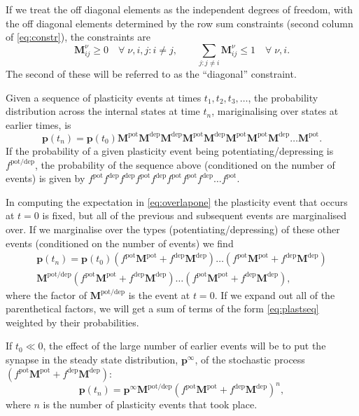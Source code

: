 \documentclass[12pt]{article}
\newcommand{\pr}{\mathbf{p}}
\newcommand{\eq}{\pr^\infty}
\newcommand{\M}{\mathbf{M}}
\newcommand{\pot}{^{\text{pot}}}
\newcommand{\dep}{^{\text{dep}}}
\newcommand{\potdep}{^{\text{pot/dep}}}
\begin{document}
If we treat the off diagonal elements as the independent degrees of freedom, with the off diagonal elements determined by the row sum constraints (second column of \eqref{eq:constr}), the constraints are
%
\begin{equation}\label{eq:constri}
  \M^\nu_{i j} \geq 0
    \quad \forall \; \nu, i, j : i \neq j, \qquad
  \sum_{j : j\neq i} \M^\nu_{ij} \leq 1
    \quad \forall \; \nu, i.
\end{equation}
%
The second of these will be referred to as the ``diagonal'' constraint.

Given a sequence of plasticity events at times $t_1,t_2,t_3,\ldots$, the probability distribution across the internal states at time $t_n$, 
mariginalising over states at earlier times, is
%
\begin{equation}\label{eq:plastseq}
  \pr(t_n) = \pr(t_0)  \M\pot \M\dep \M\dep \M\pot \M\dep \M\pot \M\pot \M\dep \ldots \M\pot .
\end{equation}
%
If the probability of a given plasticity event being potentiating/depressing is $f\potdep$, the probability of the sequence above (conditioned on the number of events) is given by $f\pot f\dep f\dep f\pot f\dep f\pot f\pot f\dep \ldots f\pot$.

In computing the expectation in \eqref{eq:overlapone} the plasticity event that occurs at $t=0$ is fixed, but all of the previous and subsequent events are marginalised over.
If we marginalise over the types (potentiating/depressing) of these other events (conditioned on the number of events) we find
%
\begin{multline}\label{eq:plastseqtypes}
  \pr(t_n) = \pr(t_0) (f\pot\M\pot+f\dep\M\dep)  \ldots (f\pot\M\pot+f\dep\M\dep) \\
    \M\potdep (f\pot\M\pot+f\dep\M\dep) \ldots (f\pot\M\pot+f\dep\M\dep),
\end{multline}
%
where the factor of $\M\potdep$ is the event at $t=0$.
If we expand out all of the parenthetical factors, we will get a sum of terms of the form \eqref{eq:plastseq} weighted by their probabilities.

If $t_0 \ll 0$, the effect of the large number of earlier events will be to put the synapse in the steady state distribution, $\eq$, of the stochastic process $(f\pot\M\pot+f\dep\M\dep)$:
%
\begin{equation}\label{eq:plastseqeq}
  \pr(t_n) = \eq \M\potdep (f\pot\M\pot+f\dep\M\dep)^n,
\end{equation}
%
where $n$ is the number of plasticity events that took place.
\end{document}

